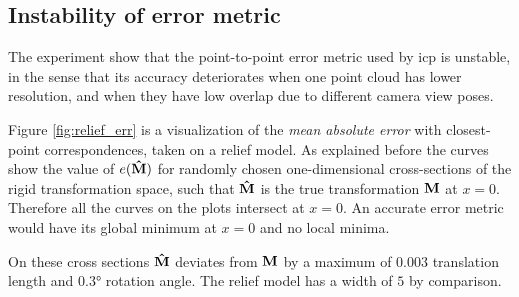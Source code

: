 \subsection{Instability of error metric}
The experiment show that the point-to-point error metric used by \gls{icp} is unstable, in the sense that its accuracy deteriorates when one point cloud has lower resolution, and when they have low overlap due to different camera view poses.

Figure \ref{fig:relief_err} is a visualization of the \emph{mean absolute error} with closest-point correspondences, taken on a relief model. As explained before the curves show the value of $e(\mathbf{\hat{M}})$ for randomly chosen one-dimensional cross-sections of the rigid transformation space, such that $\mathbf{\hat{M}}$ is the true transformation $\mathbf{M}$ at $x = 0$. Therefore all the curves on the plots intersect at $x = 0$. An accurate error metric would have its global minimum at $x = 0$ and no local minima.

On these cross sections $\mathbf{\hat{M}}$ deviates from $\mathbf{M}$ by a maximum of $0.003$ translation length and $0.3\si{\degree}$ rotation angle. The relief model has a width of $5$ by comparison.

